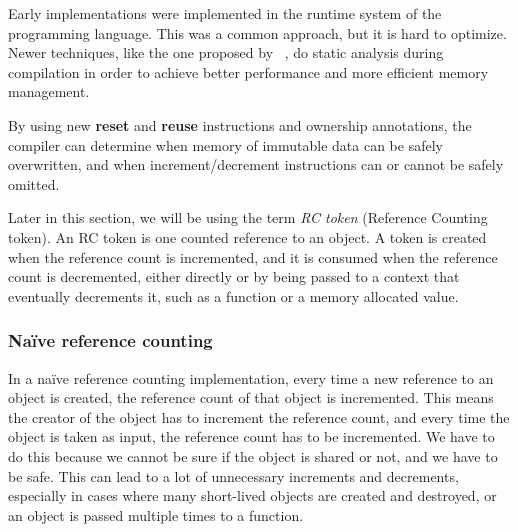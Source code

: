 Early implementations were implemented in the runtime system of the programming language. This was a common approach, but it is hard to optimize.
Newer techniques, like the one proposed by \citeauthor*{ullrich_counting_2021}~\cite{ullrich_counting_2021}, do static analysis during compilation in order to achieve better performance and more efficient memory management. 

By using new \textbf{reset} and \textbf{reuse} instructions and ownership annotations, the compiler can determine when memory of immutable data can be safely overwritten, and when increment/decrement instructions can or cannot be safely omitted.


Later in this section, we will be using the term \textit{RC token} (Reference Counting token).
An RC token is one counted reference to an object.
A token is created when the reference count is incremented, and it is consumed when the reference count is decremented, either directly or by being passed to a context that eventually decrements it, such as a function or a memory allocated value.



\subsubsection{Naïve reference counting}

In a naïve reference counting implementation, every time a new reference to an object is created, the reference count of that object is incremented. This means the creator of the object has to increment the reference count, and every time the object is taken as input, the reference count has to be incremented. We have to do this because we cannot be sure if the object is shared or not, and we have to be safe. This can lead to a lot of unnecessary increments and decrements, especially in cases where many short-lived objects are created and destroyed, or an object is passed multiple times to a function.

